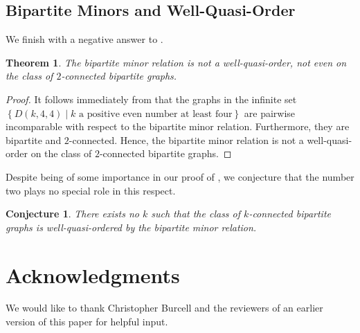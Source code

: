 \documentclass[a4paper,preprint,12pt]{elsarticle}
\newtheorem{theorem}{Theorem}
\newtheorem{conjecture}{Conjecture}
\newcommand{\curlybrackets}[1]{\left\{#1\right\}}
\begin{document}
\subsection{Bipartite Minors and Well-Quasi-Order}
\label{subsec: bip minors and well-order}
We finish with a negative answer to .
\begin{theorem}
    \label{thm: bip minor not a well ordering}
    The bipartite minor relation is not a well-quasi-order, not even on the class of $2$-connected bipartite graphs.
\end{theorem}
\begin{proof}
    It follows immediately from  that the graphs in the infinite set
    $\curlybrackets{D(k,4,4)\mid k\text{ a positive even number at least four}}$ are pairwise incomparable with respect to the bipartite minor relation.
    Furthermore, they are bipartite and $2$-connected.
    Hence, the bipartite minor relation is not a well-quasi-order on the class of $2$-connected bipartite graphs.
\end{proof}

Despite being of some importance in our proof of , we conjecture that the number two plays no special role in this respect.
\begin{conjecture}
    There exists no $k$ such that the class of $k$-connected bipartite graphs is well-quasi-ordered by the bipartite minor relation.
\end{conjecture}

\section{Acknowledgments}
We would like to thank Christopher Burcell and the reviewers of an earlier version of this paper for helpful input.



\end{document}
